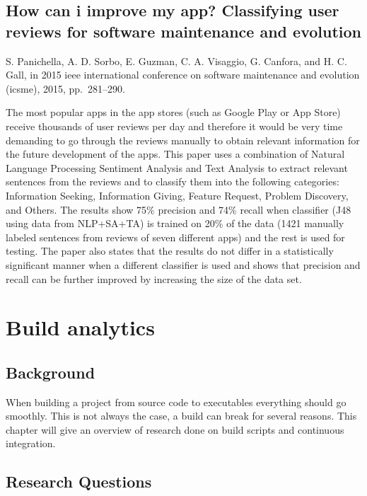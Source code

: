 \documentclass[]{book}
\begin{document}
\section{How can i improve my app? Classifying user reviews for software
maintenance and
evolution}\label{how-can-i-improve-my-app-classifying-user-reviews-for-software-maintenance-and-evolution}

S. Panichella, A. D. Sorbo, E. Guzman, C. A. Visaggio, G. Canfora, and
H. C. Gall, in 2015 ieee international conference on software
maintenance and evolution (icsme), 2015, pp.~281--290.

The most popular apps in the app stores (such as Google Play or App
Store) receive thousands of user reviews per day and therefore it would
be very time demanding to go through the reviews manually to obtain
relevant information for the future development of the apps. This paper
uses a combination of Natural Language Processing Sentiment Analysis and
Text Analysis to extract relevant sentences from the reviews and to
classify them into the following categories: Information Seeking,
Information Giving, Feature Request, Problem Discovery, and Others. The
results show 75\% precision and 74\% recall when classifier (J48 using
data from NLP+SA+TA) is trained on 20\% of the data (1421 manually
labeled sentences from reviews of seven different apps) and the rest is
used for testing. The paper also states that the results do not differ
in a statistically significant manner when a different classifier is
used and shows that precision and recall can be further improved by
increasing the size of the data set.

\chapter{Build analytics}\label{build-analytics}

\section{Background}\label{background}

When building a project from source code to executables everything
should go smoothly. This is not always the case, a build can break for
several reasons. This chapter will give an overview of research done on
build scripts and continuous integration.

\section{Research Questions}\label{research-questions}
\end{document}
